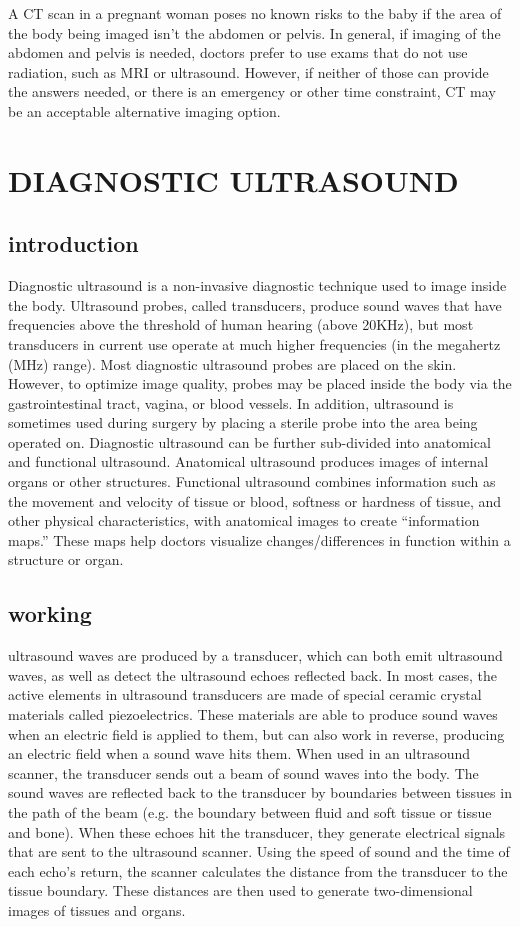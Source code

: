 \documentclass{article}
\begin{document}
A CT scan in a pregnant woman poses no known risks to the baby if the area of the body being imaged isn’t the abdomen or pelvis. In general, if imaging of the abdomen and pelvis is needed, doctors prefer to use exams that do not use radiation, such as MRI or ultrasound. However, if neither of those can provide the answers needed, or there is an emergency or other time constraint, CT may be an acceptable alternative imaging option.
\clearpage

\section{DIAGNOSTIC ULTRASOUND}

\subsection{introduction}
Diagnostic ultrasound is a non-invasive diagnostic technique used to image inside the body. Ultrasound probes, called transducers, produce sound waves that have frequencies above the threshold of human hearing (above 20KHz), but most transducers in current use operate at much higher frequencies (in the megahertz (MHz) range). Most diagnostic ultrasound probes are placed on the skin. However, to optimize image quality, probes may be placed inside the body via the gastrointestinal tract, vagina, or blood vessels. In addition, ultrasound is sometimes used during surgery by placing a sterile probe into the area being operated on.  
Diagnostic ultrasound can be further sub-divided into anatomical and functional ultrasound. Anatomical ultrasound produces images of internal organs or other structures. Functional ultrasound combines information such as the movement and velocity of tissue or blood, softness or hardness of tissue, and other physical characteristics, with anatomical images to create “information maps.” These maps help doctors visualize changes/differences in function within a structure or organ.

\subsection{working}
ultrasound waves are produced by a transducer, which can both emit ultrasound waves, as well as detect the ultrasound echoes reflected back. In most cases, the active elements in ultrasound transducers are made of special ceramic crystal materials called piezoelectrics. These materials are able to produce sound waves when an electric field is applied to them, but can also work in reverse, producing an electric field when a sound wave hits them. When used in an ultrasound scanner, the transducer sends out a beam of sound waves into the body. The sound waves are reflected back to the transducer by boundaries between tissues in the path of the beam (e.g. the boundary between fluid and soft tissue or tissue and bone). When these echoes hit the transducer, they generate electrical signals that are sent to the ultrasound scanner. Using the speed of sound and the time of each echo’s return, the scanner calculates the distance from the transducer to the tissue boundary. These distances are then used to generate two-dimensional images of tissues and organs.
\end{document}

